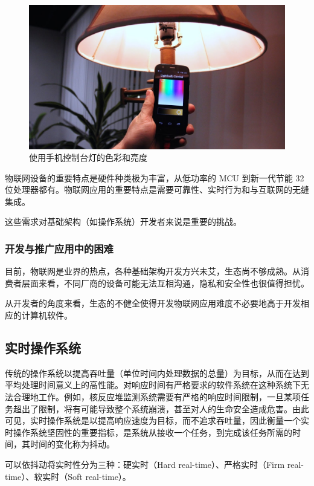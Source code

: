 \documentclass{ctexart}
\begin{document}
\begin{figure}
	\centering
	\includegraphics[scale=0.27]{Lightbulb.jpg}
	\caption{使用手机控制台灯的色彩和亮度}
\end{figure}

物联网设备的重要特点是硬件种类极为丰富，从低功率的 MCU 到新一代节能 32 位处理器都有。物联网应用的重要特点是需要可靠性、实时行为和与互联网的无缝集成。

这些需求对基础架构（如操作系统）开发者来说是重要的挑战。

\subsubsection{开发与推广应用中的困难}

目前，物联网是业界的热点，各种基础架构开发方兴未艾，生态尚不够成熟。从消费者层面来看，不同厂商的设备可能无法互相沟通，隐私和安全性也很值得担忧。

从开发者的角度来看，生态的不健全使得开发物联网应用难度不必要地高于开发相应的计算机软件。

\subsection{实时操作系统}

传统的操作系统以提高吞吐量（单位时间内处理数据的总量）为目标，从而在达到平均处理时间意义上的高性能。对响应时间有严格要求的软件系统在这种系统下无法合理地工作。例如，核反应堆监测系统需要有严格的响应时间限制，一旦某项任务超出了限制，将有可能导致整个系统崩溃，甚至对人的生命安全造成危害。由此可见，实时操作系统是以提高响应速度为目标，而不追求吞吐量，因此衡量一个实时操作系统坚固性的重要指标，是系统从接收一个任务，到完成该任务所需的时间，其时间的变化称为抖动。

可以依抖动将实时性分为三种：硬实时（Hard real-time）、严格实时（Firm real-time）、软实时（Soft real-time）。
\end{document}
